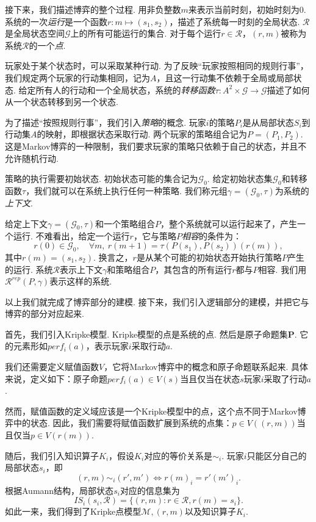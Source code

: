 接下来，我们描述博弈的整个过程. 用非负整数$m$来表示当前时刻，初始时刻为$0$. 系统的一次\emph{运行}是一个函数$r: m \mapsto (s_1, s_2)$，描述了系统每一时刻的全局状态. $\mathcal{R}$是全局状态空间$\mathcal{G}$上的所有可能运行的集合. 对于每个运行$r \in \mathcal{R}$，$(r, m)$被称为系统$\mathcal{R}$的一个\emph{点}. 

玩家处于某个状态时，可以采取某种行动. 为了反映“玩家按照相同的规则行事”，我们规定两个玩家的行动集相同，记为$A$，且这一行动集不依赖于全局或局部状态. 给定所有人的行动和一个全局状态，系统的\emph{转移函数}$\tau: A^2 \times \mathcal{G} \to \mathcal{G}$描述了如何从一个状态转移到另一个状态. 

为了描述“按照规则行事”，我们引入\emph{策略}的概念. 玩家$i$的策略$P_i$是从局部状态$S_i$到行动集$A$的映射，即根据状态采取行动. 两个玩家的策略组合记为$P = (P_1, P_2)$. 这是Markov博弈的一种限制，我们要求玩家的策略只依赖于自己的状态，并且不允许随机行动. 

策略的执行需要初始状态. 初始状态可能的集合记为$\mathcal{G}_0$. 给定初始状态集$\mathcal{G}_0$和转移函数$\tau$，我们就可以在系统上执行任何一种策略. 我们称元组$\gamma = (\mathcal{G}_0, \tau)$为系统的\emph{上下文}. 

给定上下文$\gamma = (\mathcal{G}_0, \tau)$和一个策略组合$P$，整个系统就可以运行起来了，产生一个运行. 不难看出，给定一个运行$r$，它与策略$P$\emph{相容}的条件为：
\[
r(0) \in \mathcal{G}_0, \quad \forall m,\ r(m+1) = \tau(P(s_1), P(s_2))(r(m)),
\]
其中$r(m) = (s_1, s_2)$. 换言之，$r$是从某个可能的初始状态开始执行策略$P$产生的运行. 系统$\mathcal{R}$表示上下文$\gamma$和策略组合$P$，其包含的所有运行$r$都与$P$相容. 我们用$\mathcal{R}^{rep}(P, \gamma)$表示这样的系统. 

以上我们就完成了博弈部分的建模. 接下来，我们引入逻辑部分的建模，并把它与博弈的部分对应起来. 

首先，我们引入Kripke模型. Kripke模型的点是系统的点. 然后是原子命题集$\mathbf{P}$. 它的元素形如$perf_i(a)$，表示玩家$i$采取行动$a$. 

我们还需要定义赋值函数$V$，它将Markov博弈中的概念和原子命题联系起来. 具体来说，定义如下：原子命题$perf_i(a)\in V(s)$当且仅当在状态$s$玩家$i$采取了行动$a$. 

然而，赋值函数的定义域应该是一个Kripke模型中的点，这个点不同于Markov博弈中的状态. 因此，我们需要将赋值函数扩展到系统的点集：$p \in V((r, m))$当且仅当$p\in V(r(m))$. 

随后，我们引入知识算子$K_i$，假设$K_i$对应的等价关系是$\sim_i$. 玩家$i$只能区分自己的局部状态$s_i$，即
\[(r, m) \sim_i (r', m')\iff r(m)_i = r'(m')_i.\]
根据Aumann结构，局部状态$s_i$对应的信息集为
\[
IS_i(s_i, \mathcal{R}) = \{(r, m): r \in \mathcal{R}, r(m) = s_i\}.
\]
如此一来，我们得到了Kripke点模型$\mathcal{M}, (r, m)$以及知识算子$K_i$.

